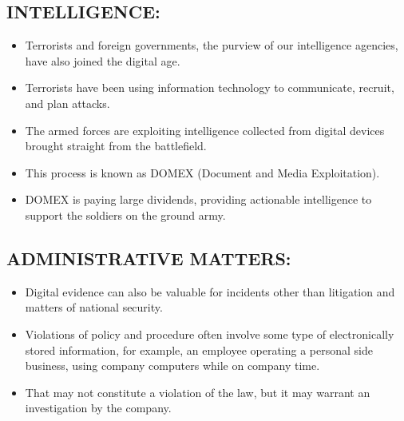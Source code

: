 \documentclass[10pt,british,english]{article}
\begin{document}
\subsection{INTELLIGENCE:}
\begin{itemize}
\item Terrorists and foreign governments, the purview of our intelligence
agencies, have also joined the digital age. 
\item Terrorists have been using information technology to communicate,
recruit, and plan attacks. 
\item The armed forces are exploiting intelligence collected from digital
devices brought straight from the battlefield. 
\item This process is known as DOMEX (Document and Media Exploitation). 
\item DOMEX is paying large dividends, providing actionable intelligence
to support the soldiers on the ground army.
\end{itemize}

\subsection{ADMINISTRATIVE MATTERS:}
\begin{itemize}
\item Digital evidence can also be valuable for incidents other than litigation
and matters of national security. 
\item Violations of policy and procedure often involve some type of electronically
stored information, for example, an employee operating a personal
side business, using company computers while on company time. 
\item That may not constitute a violation of the law, but it may warrant
an investigation by the company.
\end{itemize}
\end{document}
